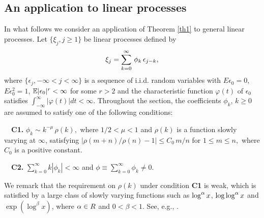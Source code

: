 \subsection{An application to linear processes}
In what follows we consider an  application of Theorem \ref {th1} to general linear processes.
Let $\{\xi _{j},j\geq 1\}$ be linear processes defined by
\begin{equation}
\xi _{j}=\sum_{k=0}^{\infty }\,\phi _{k}\,\epsilon _{j-k}, \la {eqn:3:f1}
\end{equation}
where $\{\epsilon _{j},-\infty <j<\infty \}$ is a sequence of i.i.d.
random variables with $E\epsilon _{0}=0$, $E\epsilon _{0}^{2}=1$, $\mathbb E|\epsilon_0|^r < \infty$ for some $r > 2$ and the
characteristic function $\varphi (t)$ of $\epsilon _{0}$ satisfies
$\int_{-\infty
}^{\infty }|\varphi (t)|dt<\infty $. Throughout the section, the coefficients $\phi_k$, $k \ge 0$ are assumed to satisfy one of the following conditions:

\noindent
\ \ \textbf{C1.} $\phi _{k}\sim k^{-\mu }\,\rho(k),$ where $1/2<\mu <1$ and $
\rho(k)$ is a function slowly varying at $\infty $, satisfying
$
|\rho(m+n)/\rho(n)-1| \le C_0\, m/n$ for $1\le m\le n,$
where $C_0$ is a positive constant.

\noindent
\ \ \textbf{C2.} $\sum_{k=0}^{\infty }k |\phi _{k}|<\infty $ and $\phi \equiv
\sum_{k=0}^{\infty }\phi_{k}\not =0$.

\noindent We remark that the requirement on $\rho(k)$ under condition {\bf C1} is weak,
which is satisfied by a large class of slowly varying functions such as $\log^{\alpha}x$,
$\log\log^{\alpha}x$ and $\exp(\log ^{\beta}x)$, where $\alpha\in R$ and $0<\beta<1$. See, e.g., \cite{wanglingulati2003a}.

